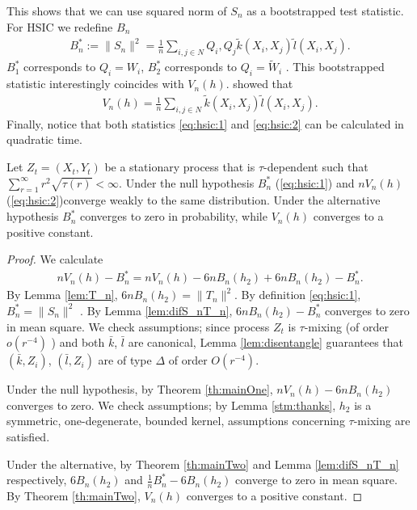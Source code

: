 This shows  that we can use squared norm of $S_n$ as a bootstrapped test statistic.  For HSIC we redefine $B_n$ 
\begin{align}
\label{eq:hsic:1}
B_n^* :=  \| S_n \|^2 = \frac 1  n \sum_{i,j \in N }Q_i, Q_j \tilde k(X_i,X_j) \tilde l(X_i,X_j).
\end{align}
$B_{1}^*$ corresponds to $Q_i=W_i$, $B_{2}^*$  corresponds to $Q_i= \tilde W_i$ . This bootstrapped statistic interestingly coincides with $V_n(h)$. \cite{gretton_kernel_2008} showed that 
\begin{align}
\label{eq:hsic:2}
V_n(h) = \frac 1  n \sum_{i,j \in N }\tilde k(X_i,X_j) \tilde l(X_i,X_j).
\end{align}
Finally, notice that both statistics \ref{eq:hsic:1} and \ref{eq:hsic:2} can be calculated in quadratic time.


\begin{proposition}
\label{prop:null}
Let  $Z_t=\left(X_t,Y_t\right)$  be a stationary process  that is $\tau$-dependent such that $\sum_{r=1}^{\infty} r^2 \sqrt{ \tau(r)} <\infty$. Under the null hypothesis  $B_n^*$ (\ref{eq:hsic:1}) and $n V_n(h)$  (\ref{eq:hsic:2})converge weakly to the same distribution. Under the alternative hypothesis $B_n^*$  converges to zero in probability, while $V_n(h)$ converges to a positive constant. 
\end{proposition}
\begin{proof}
We calculate 
\begin{align*}
 n V_n(h) - B_n^* = n V_n(h) - 6 nB_n(h_2) + 6 nB_n(h_2) -  B_n^* .
\end{align*}
 By Lemma \ref{lem:T_n},  $6 nB_n(h_2) = \| T_n \|^2$. By definition \eqref{eq:hsic:1}, $B_n^* =  \| S_n \|^2 $ .  By Lemma \ref{lem:difS_nT_n}, $6 nB_n(h_2) -  B_n^*$ converges to zero in mean square. We check assumptions; since process $Z_t$ is $\tau$-mixing (of order $o(r^{-4})$ ) and both $\bar k$, $\bar l$ are canonical, Lemma \ref{lem:disentangle} guarantees that  $(\bar k,Z_i)$, $(\bar l,Z_i)$  are of type $\varDelta$ of order $O(r^{-4})$.
 
 Under the null  hypothesis, by Theorem \ref{th:mainOne}, $n V_n(h) - 6 nB_n(h_2)$ converges to zero.  We check assumptions; by Lemma \ref{stm:thanks}, $h_2$ is a symmetric, one-degenerate, bounded kernel, assumptions concerning $\tau$-mixing are satisfied. 
 
 Under the alternative, by Theorem \ref{th:mainTwo} and  Lemma \ref{lem:difS_nT_n} respectively,  $6 B_n(h_2)$ and $\frac 1 n B_n^* -6 B_n(h_2) $ converge to zero in mean square. By Theorem \ref{th:mainTwo}, $V_n(h)$ converges to a positive constant.
 \end{proof}

